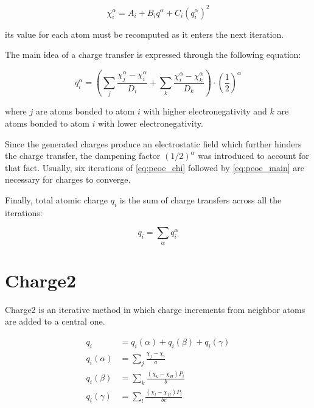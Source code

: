 \documentclass[oneside]{memoir}
\newcommand\ddfrac[2]{\frac{\displaystyle #1}{\displaystyle #2}}
\begin{document}
\begin{equation}
\label{eq:peoe_chi}
\chi_i^\alpha = A_i + B_iq^\alpha + C_i(q_i^\alpha)^2
\end{equation}

its value for each atom must be recomputed as it enters the next iteration.

The main idea of a charge transfer is expressed through the following equation:

\begin{equation}
\label{eq:peoe_main}
q_i^\alpha = \left(\sum_j \ddfrac{\chi_j^\alpha - \chi_i^\alpha}{D_i} + \sum_k \ddfrac{\chi_i^\alpha - \chi_k^\alpha}{D_k}\right)\cdot{\left(\ddfrac{1}{2}\right)}^\alpha
\end{equation}

where $j$ are atoms bonded to atom $i$ with higher electronegativity and $k$ are atoms bonded to atom $i$ with lower electronegativity.

Since the generated charges produce an electrostatic field which further hinders the charge transfer, the dampening factor $(1/2)^\alpha$ was introduced to account for that fact. Usually, six iterations of \ref{eq:peoe_chi} followed by \ref{eq:peoe_main} are necessary for charges to converge.

Finally, total atomic charge $q_i$ is the sum of charge transfers across all the iterations:

\begin{equation}
\label{eq:peoe_total}
q_i = \sum_\alpha q_i^\alpha
\end{equation}

\section*{Charge2}
\label{sec:methods_charge2}

Charge2 \cite{Abraham1982} is an iterative method in which charge increments from neighbor atoms are added to a central one.

\begin{align}
\label{eq:charge2_main}
q_i &= q_i(\alpha) + q_i(\beta) + q_i(\gamma)\\
q_i(\alpha) &= \sum_j \ddfrac{\chi_j - \chi_i}{a}\\
q_i(\beta) &= \sum_k \ddfrac{(\chi_k - \chi_H)P_i}{b}\\
q_i(\gamma) &= \sum_l \ddfrac{(\chi_l - \chi_H)P_i}{bc}\\
\end{align}
\end{document}
